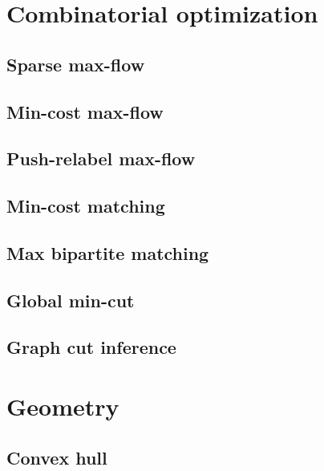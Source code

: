 \documentclass[twocolumn]{article}
\begin{document}
\begin{landscape}
\tableofcontents

\section{Combinatorial optimization}
\subsection{Sparse max-flow}
\raggedbottom
\subsection{Min-cost max-flow}
\raggedbottom
\subsection{Push-relabel max-flow}
\raggedbottom
\subsection{Min-cost matching}
\raggedbottom
\subsection{Max bipartite matching}
\raggedbottom
\subsection{Global min-cut}
\raggedbottom
\subsection{Graph cut inference}
\raggedbottom

\section{Geometry}
\subsection{Convex hull}
\raggedbottom

\end{landscape}
\end{document}
